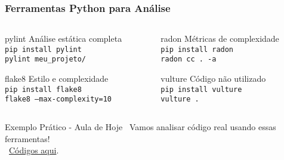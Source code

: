 \documentclass[aspectratio=169]{beamer}
\begin{document}
\begin{frame}
\frametitle{Ferramentas Python para Análise}
\begin{columns}
\begin{column}{0.5\textwidth}
\begin{block}{pylint}
\footnotesize
Análise estática completa\\
\texttt{pip install pylint}\\
\texttt{pylint meu\_projeto/}
\end{block}

\begin{block}{flake8}
\footnotesize
Estilo e complexidade\\
\texttt{pip install flake8}\\
\texttt{flake8 --max-complexity=10}
\end{block}
\end{column}

\begin{column}{0.5\textwidth}
\begin{block}{radon}
\footnotesize
Métricas de complexidade\\
\texttt{pip install radon}\\
\texttt{radon cc . -a}
\end{block}

\begin{block}{vulture}
\footnotesize
Código não utilizado\\
\texttt{pip install vulture}\\
\texttt{vulture .}
\end{block}
\end{column}
\end{columns}

\vspace{0.5cm}
\begin{alertblock}{Exemplo Prático - Aula de Hoje}
\footnotesize
\faCode \, Vamos analisar código real usando essas ferramentas! \\
\faGithub \, \href{https://github.com/fmarquesfilho/bpp-2025-2/blob/main/src/s4/}{Códigos aqui}.
\end{alertblock}
\end{frame}
\end{document}
